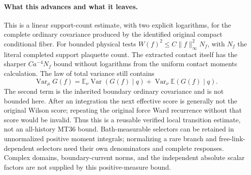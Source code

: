 \documentclass[11pt]{article}
\newcommand{\E}{\mathbb E}
\newcommand{\Var}{\operatorname{Var}}
\begin{document}
\paragraph{What this advances and what it leaves.}
This is a linear support-count estimate, with two explicit logarithms, for the complete
ordinary covariance produced by the identified original compact conditional fiber.
For bounded physical tests $W(f)^2\le C\|f\|_\infty^2N_f$, with $N_f$ the literal
completed support plaquette count. The extracted contact itself has the sharper
$Ca^{-4}N_f$ bound without logarithms from the uniform contact moments calculation.
The law of total variance still contains
\[
 \Var_\mu G(f)=\E_\nu\Var(G(f)\mid q)+\Var_\nu\E(G(f)\mid q).
\]
The second term is the inherited boundary ordinary covariance and is not bounded here.
After an integration the next effective score is generally not the original Wilson score;
repeating the original force Ward recurrence without that score would be invalid.
Thus this is a reusable verified local transition estimate, not an all-history MT36 bound.
Bath-measurable selectors can be retained in unnormalized positive moment integrals;
normalizing a rare branch and free-link-dependent selectors need their own denominators
and complete responses. Complex domains, boundary-current norms, and the independent
absolute scalar factors are not supplied by this positive-measure bound.
\end{document}
